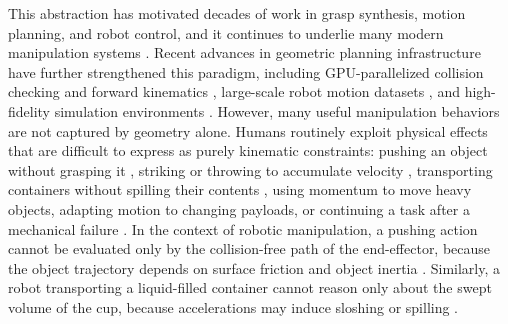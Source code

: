 This abstraction has motivated decades of work in grasp synthesis, motion planning, and robot control, and it continues to underlie many modern manipulation systems \cite{billard2019trends,bohg2013data,mahler2017dex}.
Recent advances in geometric planning infrastructure have further strengthened this paradigm, including GPU-parallelized collision checking and forward kinematics \cite{sundaralingam2023curobo,thomason2024motions}, large-scale robot motion datasets \cite{o2024open}, and high-fidelity simulation environments \cite{coumans2021}.
However, many useful manipulation behaviors are not captured by geometry alone.
Humans routinely exploit physical effects that are difficult to express as purely kinematic constraints: pushing an object without grasping it \cite{mason2018toward,stuber2020let}, striking or throwing to accumulate velocity \cite{zeng2020tossingbot}, transporting containers without spilling their contents \cite{abderezaei2024clutter}, using momentum to move heavy objects, adapting motion to changing payloads, or continuing a task after a mechanical failure \cite{briscoe2024exploring}.
In the context of robotic manipulation, a pushing action cannot be evaluated only by the collision-free path of the end-effector, because the object trajectory depends on surface friction and object inertia \cite{mason2018toward}.
Similarly, a robot transporting a liquid-filled container cannot reason only about the swept volume of the cup, because accelerations may induce sloshing or spilling \cite{abderezaei2024clutter}.

